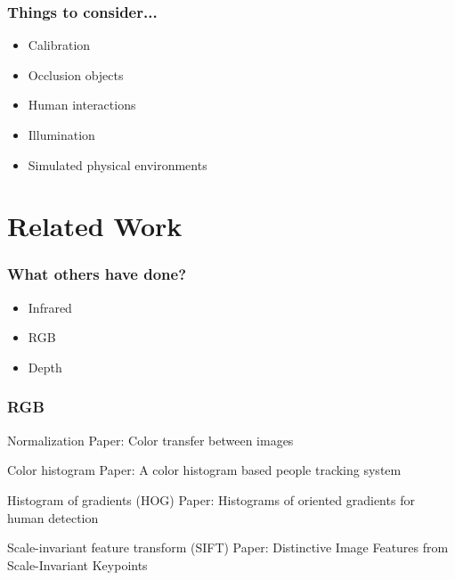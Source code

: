 \documentclass{beamer}
\begin{document}
\begin{frame}
\frametitle{Things to consider...}
\begin{itemize}
	\item Calibration
	\item Occlusion objects
	\item Human interactions
	\item Illumination
	\item Simulated physical environments
\end{itemize}
\end{frame}

\section{Related Work}

\begin{frame}
\frametitle{What others have done?}
\begin{itemize}
	\item Infrared
	\item RGB
	\item Depth
\end{itemize}
\end{frame}


\begin{frame}
\frametitle{RGB}
\begin{block}{Normalization}
Paper: Color transfer between images \cite{color_transfer}
\end{block}

\begin{block}{Color histogram}
Paper: A color histogram based people tracking system \cite{color_histogram}
\end{block}

\begin{block}{Histogram of gradients (HOG)}
Paper: Histograms of oriented gradients for human detection \cite{hog}
\end{block}

\begin{block}{Scale-invariant feature transform (SIFT)}
Paper: Distinctive Image Features from Scale-Invariant Keypoints \cite{sift}
\end{block}
\end{frame}
\end{document}
